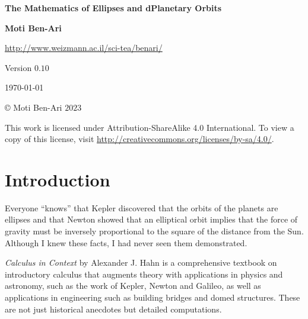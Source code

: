 

\thispagestyle{empty}

\begin{center}
\textbf{\LARGE The Mathematics of Ellipses and dPlanetary Orbits}

\bigskip
\bigskip
\bigskip

\textbf{\Large Moti Ben-Ari}

\bigskip

\url{http://www.weizmann.ac.il/sci-tea/benari/}

\bigskip
\bigskip
\bigskip

Version $0.10$

\bigskip

\today

\end{center}

\vfill

\begin{center}
\copyright{} Moti Ben-Ari $2023$
\end{center}
 
\begin{small}
This work is licensed under Attribution-ShareAlike 4.0 International. To view a copy of this license, visit \url{http://creativecommons.org/licenses/by-sa/4.0/}.
\end{small}

\newpage

\tableofcontents

\newpage

\section{Introduction}

Everyone ``knows'' that Kepler discovered that the orbits of the planets are ellipses and that Newton showed that an elliptical orbit implies that the force of gravity must be inversely proportional to the square of the distance from the Sun. Although I knew these facts, I had never seen them demonstrated.

\textit{Calculus in Context} \cite{hahn-cic} by Alexander J. Hahn is a comprehensive textbook on introductory calculus that augments theory with  applications in physics and astronomy, such as the work of Kepler, Newton and Galileo, as well as applications in engineering such as building bridges and domed structures. These are not just historical anecdotes but detailed computations.

